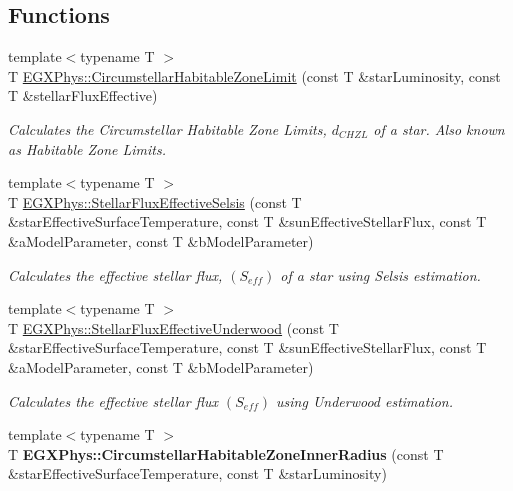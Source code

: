 \subsection*{Functions}
\begin{DoxyCompactItemize}
\item 
{\footnotesize template$<$typename T $>$ }\\T \mbox{\hyperlink{group___astrophysics_ga23a8f602461ea3257e8767b1d455c383}{E\+G\+X\+Phys\+::\+Circumstellar\+Habitable\+Zone\+Limit}} (const T \&star\+Luminosity, const T \&stellar\+Flux\+Effective)
\begin{DoxyCompactList}\small\item\em Calculates the Circumstellar Habitable Zone Limits, $d_{CHZL}$ of a star. Also known as Habitable Zone Limits. \end{DoxyCompactList}\item 
{\footnotesize template$<$typename T $>$ }\\T \mbox{\hyperlink{group___astrophysics_ga3ce3a04fec7b1c8fb66ac54270ce3902}{E\+G\+X\+Phys\+::\+Stellar\+Flux\+Effective\+Selsis}} (const T \&star\+Effective\+Surface\+Temperature, const T \&sun\+Effective\+Stellar\+Flux, const T \&a\+Model\+Parameter, const T \&b\+Model\+Parameter)
\begin{DoxyCompactList}\small\item\em Calculates the effective stellar flux, $(S_{eff})$ of a star using Selsis estimation. \end{DoxyCompactList}\item 
{\footnotesize template$<$typename T $>$ }\\T \mbox{\hyperlink{group___astrophysics_ga34d1e39bce17904bc6d383f1935c79d6}{E\+G\+X\+Phys\+::\+Stellar\+Flux\+Effective\+Underwood}} (const T \&star\+Effective\+Surface\+Temperature, const T \&sun\+Effective\+Stellar\+Flux, const T \&a\+Model\+Parameter, const T \&b\+Model\+Parameter)
\begin{DoxyCompactList}\small\item\em Calculates the effective stellar flux $(S_{eff})$ using Underwood estimation. \end{DoxyCompactList}\item 
\mbox{\label{namespace_e_g_x_phys_abcc7fdd3086efb4c0b786960a45c02e2}} 
{\footnotesize template$<$typename T $>$ }\\T {\bfseries E\+G\+X\+Phys\+::\+Circumstellar\+Habitable\+Zone\+Inner\+Radius} (const T \&star\+Effective\+Surface\+Temperature, const T \&star\+Luminosity)

\end{DoxyCompactItemize}
